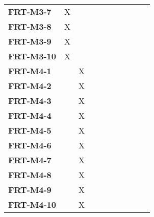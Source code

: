\documentclass[12pt, titlepage]{article}
\begin{document}
\begin{longtable}{|l|ccccccc|}
	\textbf{FRT-M3-7}  & X                                        & ~           & ~           & ~           & ~           & ~           & ~           \\
	\textbf{FRT-M3-8}  & X                                        & ~           & ~           & ~           & ~           & ~           & ~           \\
	\textbf{FRT-M3-9}  & X                                        & ~           & ~           & ~           & ~           & ~           & ~           \\
	\textbf{FRT-M3-10} & X                                        & ~           & ~           & ~           & ~           & ~           & ~           \\
	\textbf{FRT-M4-1}  & ~                                        & X           & ~           & ~           & ~           & ~           & ~           \\
	\textbf{FRT-M4-2}  & ~                                        & X           & ~           & ~           & ~           & ~           & ~           \\
	\textbf{FRT-M4-3}  & ~                                        & X           & ~           & ~           & ~           & ~           & ~           \\
	\textbf{FRT-M4-4}  & ~                                        & X           & ~           & ~           & ~           & ~           & ~           \\
	\textbf{FRT-M4-5}  & ~                                        & X           & ~           & ~           & ~           & ~           & ~           \\
	\textbf{FRT-M4-6}  & ~                                        & X           & ~           & ~           & ~           & ~           & ~           \\
	\textbf{FRT-M4-7}  & ~                                        & X           & ~           & ~           & ~           & ~           & ~           \\
	\textbf{FRT-M4-8}  & ~                                        & X           & ~           & ~           & ~           & ~           & ~           \\
	\textbf{FRT-M4-9}  & ~                                        & X           & ~           & ~           & ~           & ~           & ~           \\
	\textbf{FRT-M4-10} & ~                                        & X           & ~           & ~           & ~           & ~           & ~           \\

\end{longtable}
\end{document}
